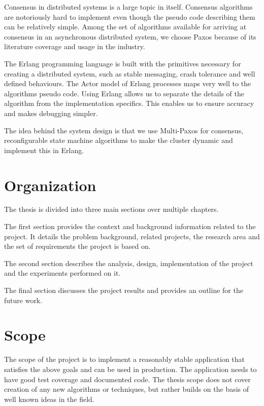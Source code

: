 Consensus in distributed systems is a large topic in itself. Consensus
algorithms are notoriously hard to implement even though the pseudo code
describing them can be relatively simple. Among the set of algorithms
available for arriving at consensus in an asynchronous distributed
system, we choose Paxos because of its literature coverage and usage
in the industry.

The Erlang programming language is built with the primitives necessary for
creating a distributed system, such as stable messaging, crash tolerance and
well defined behaviours. The Actor model of Erlang processes maps very well to
the algorithms pseudo code. Using Erlang allows us to separate the details of
the algorithm from the implementation specifics. This enables us to ensure
accuracy and makes debugging simpler.

The idea behind the system design is that we use Multi-Paxos%
 for consensus, reconfigurable state machine algorithms to make the
cluster dynamic and implement this in Erlang.

\section{Organization}
The thesis is divided into three main sections over multiple chapters.

The first section provides the context and background information related to the
project. It details the problem background, related projects, the research
area and the set of requirements the project is based on.

The second section describes the analysis, design, implementation of the project
and the experiments performed on it.

The final section discusses the project results and provides an outline for
the future work.

\section{Scope}

The scope of the project is to implement a reasonably stable application that
satisfies the above goals and can be used in production. The application needs
to have good test coverage and documented code. The thesis scope does not cover
creation of any new algorithms or techniques, but rather builds on the basis of
well known ideas in the field.

